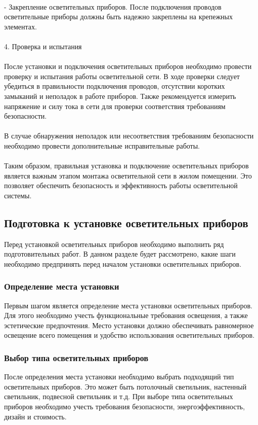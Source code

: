 \documentclass{article}
\begin{document}
~\\
- Закрепление осветительных приборов. После подключения проводов осветительные приборы должны быть надежно закреплены на крепежных элементах.\\
~\\
4. Проверка и испытания\\
~\\
После установки и подключения осветительных приборов необходимо провести проверку и испытания работы осветительной сети. В ходе проверки следует убедиться в правильности подключения проводов, отсутствии коротких замыканий и неполадок в работе приборов. Также рекомендуется измерить напряжение и силу тока в сети для проверки соответствия требованиям безопасности.\\
~\\
В случае обнаружения неполадок или несоответствия требованиям безопасности необходимо провести дополнительные исправительные работы.\\
~\\
Таким образом, правильная установка и подключение осветительных приборов является важным этапом монтажа осветительной сети в жилом помещении. Это позволяет обеспечить безопасность и эффективность работы осветительной системы.
\subsection{Подготовка к установке осветительных приборов}
Перед установкой осветительных приборов необходимо выполнить ряд подготовительных работ. В данном разделе будет рассмотрено, какие шаги необходимо предпринять перед началом установки осветительных приборов.
\subsubsection{Определение места установки}
Первым шагом является определение места установки осветительных приборов. Для этого необходимо учесть функциональные требования освещения, а также эстетические предпочтения. Место установки должно обеспечивать равномерное освещение всего помещения и удобство использования осветительных приборов.
\subsubsection{Выбор типа осветительных приборов}
После определения места установки необходимо выбрать подходящий тип осветительных приборов. Это может быть потолочный светильник, настенный светильник, подвесной светильник и т.д. При выборе типа осветительных приборов необходимо учесть требования безопасности, энергоэффективность, дизайн и стоимость.
\end{document}
